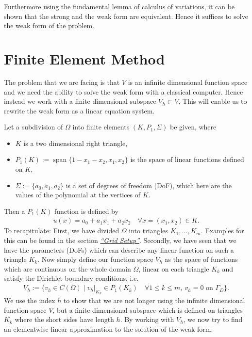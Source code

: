 \documentclass[letterpaper,10pt,english, openany]{sphinxmanual}
\begin{document}
Furthermore using the fundamental lemma of calculus of variations, it can be shown that the strong and the weak form
are equivalent. Hence it suffices to solve the weak form of the problem.


\section{Finite Element Method}
\label{\detokenize{basics:finite-element-method}}
The problem that we are facing is that \(V\) is an infinite dimensional function space
and we need the ability to solve the weak form with a classical computer.
Hence instead we work with a finite dimensional subspace \(V_h \subset V\).
This will enable us to rewrite the weak form as a linear equation system.

Let a subdivision of \(\Omega\) into {\color{blue}finite elements} \((K,P_1,\Sigma)\)
be given, where
\begin{itemize}
\item {} 
\(K\) is a two dimensional right triangle,

\item {} 
\(P_1(K) := \operatorname{span}\{1-x_1-x_2, x_1, x_2 \}\) is the space of linear functions defined on \(K\),

\item {} 
\(\Sigma := \{a_0, a_1, a_2 \}\) is a set of {\color{blue}degrees of freedom} (DoF), which here are the values of the polynomial at the vertices of \(K\).

\end{itemize}

Then a \(P_1(K)\) function is defined by
\begin{equation*}
\begin{split}u(x) = a_0 + a_1x_1 + a_2x_2 \quad \forall x = (x_1,x_2) \in K.\end{split}
\end{equation*}
To recapitulate: First, we have divided \(\Omega\) into triangles \(K_1, ..., K_m\). Examples for this can be found in the section {\hyperref[\detokenize{basics:grid-setup}]{\emph{“Grid Setup”}}}.
Secondly, we have seen that we have the parameters (DoFs) which can describe any linear function on such a triangle \(K_k\).
Now simply define our function space \(V_h\) as the space of functions which are continuous on the whole domain \(\Omega\), linear on each triangle \(K_k\) and satisfy the Dirichlet boundary conditions, i.e.
\begin{equation*}
\begin{split}V_h := \{ v_h \in C(\Omega) \mid v_h |_{K_k} \in P_1(K_k) \quad \forall 1 \leq k \leq m,\ v_h = 0 \text{ on } \Gamma_D \}.\end{split}
\end{equation*}
We use the index \(h\) to show that we are not longer using the infinite dimensional function space \(V\),
but a finite dimensional subspace which is defined on triangles \(K_k\) where the short sides have length \(h\).
By working with \(V_h\), we now try to find an element\sphinxhyphen{}wise linear approximation to the solution of the weak form.
\end{document}
